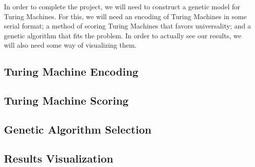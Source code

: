 In order to complete the project, we will need to construct a genetic
model for Turing Machines. For this, we will need an encoding of Turing
Machines in some serial format; a method of scoring Turing Machines that
favors universality; and a genetic algorithm that fits the problem. In
order to actually see our results, we will also need some way of
visualizing them.

\subsection{Turing Machine Encoding} 


\subsection{Turing Machine Scoring} 
\subsection{Genetic Algorithm Selection}
\subsection{Results Visualization}
